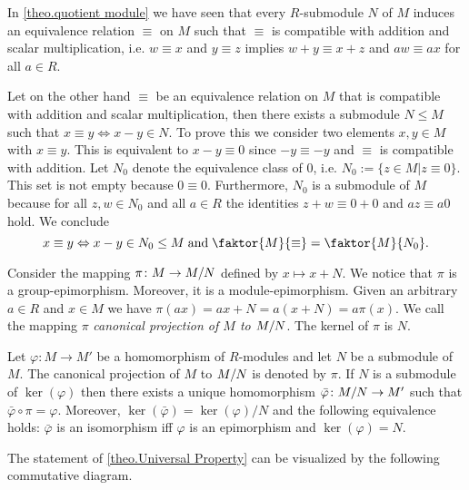 \begin{rem}
\begin{exlist}
\item In \cref{theo.quotient module} we have seen that every $R$-sub\-mod\-ule $N$ of $M$ induces an equivalence relation $\equiv$ on $M$  such that $\equiv$ is compatible with addition and scalar multiplication, i.e. $w\equiv x$ and $y\equiv z$ implies $w+y\equiv x+z$ and $aw\equiv ax$ for all $a\in R$. 

Let on the other hand $\equiv$ be an equivalence relation on $M$ that is compatible with addition and scalar multiplication, then there exists a submodule $N\leq M$ such that $x\equiv y\Leftrightarrow x-y\in N$. To prove this we consider two elements $x,y\in M$ with $x\equiv y$. This is equivalent to $x-y\equiv 0$ since $-y\equiv -y$ and $\equiv$ is compatible with addition. Let $N_0$ denote the equivalence class of 0, i.e. $N_0:=\lbrace z\in M|z\equiv 0\rbrace$. This set is not empty because $0\equiv 0$. Furthermore, $N_0$ is a submodule of $M$ because for all $z ,w\in N_0$ and all $a\in R$ the identities $z +w\equiv 0+0$ and $az\equiv a0$ hold. We conclude
\begin{equation*}
x\equiv y\Leftrightarrow x-y\in N_0\leq M \;\text{and}\; \faktor{M}{\equiv}=\faktor{M}{N_0}.
\end{equation*}
\item Consider the mapping $\pi\colon M\rightarrow M/N$ defined by $x\mapsto x+N$. We notice that $\pi$ is a group-epimorphism. Moreover, it is a module-epimorphism. Given an arbitrary $a\in R$ and $x\in M$ we have $\pi(ax)=ax+N=a(x+N)=a\pi(x)$. We call the mapping $\pi$ \emph{canonical projection of $M$ to $M/N$}. The kernel of $\pi$ is $N$.
\end{exlist}
\end{rem}

\begin{thm}\label{theo.Universal Property}
Let $\varphi\colon M \to M'$ be a homomorphism of $R$-modules and let $N$ be a submodule of $M$. The canonical projection of $M$ to $M/N$ is denoted by $\pi$. If $N$ is a submodule of $\ker(\varphi)$ then there exists a unique homomorphism $\bar{\varphi}\colon M/N\rightarrow M'$ such that $\bar{\varphi}\circ\pi=\varphi$. Moreover, $\ker(\bar{\varphi})=\ker(\varphi)/N$ and the following equivalence holds: $\bar{\varphi}$ is an isomorphism iff $\varphi$ is an epimorphism and $\ker(\varphi)=N$.
\end{thm}

The statement of \cref{theo.Universal Property} can be visualized by the following commutative diagram.


